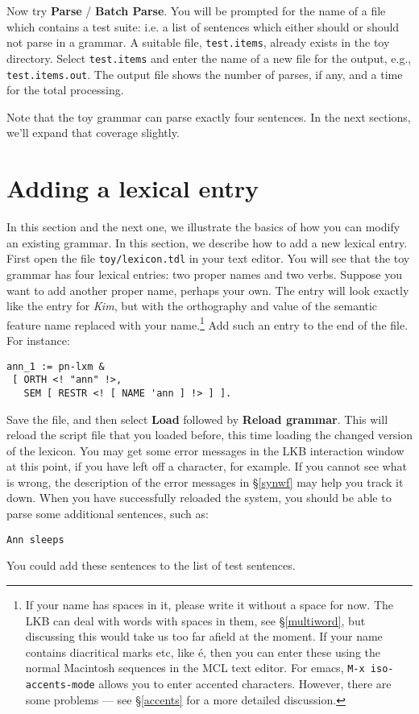 \documentclass[12pt]{report}
\begin{document}
Now try {\bf Parse} / {\bf Batch Parse}.  You will be prompted for the
name of a file which contains a test suite: i.e. a list of sentences
which either should or should not parse in a grammar.  A suitable file,
{\tt test.items}, already exists in the toy directory.  Select 
{\tt test.items} and enter the name of a new file for the output,
e.g., {\tt test.items.out}.  The output file shows the number of parses, if
any, and a time for the total processing.

Note that the toy grammar can parse exactly four 
sentences.  In the next sections, we'll expand that coverage slightly.


\section{Adding a lexical entry}

In this section and the next one, we illustrate the basics of how you can
modify an existing grammar.
In this section, we describe how to add a new lexical entry.
First open the file {\tt toy/lexicon.tdl} in your text editor.
You will see that
the toy grammar has four lexical entries: two proper names and two verbs.
Suppose you want to add another proper name,
perhaps your own.  The entry will look exactly like
the entry for {\it Kim}, but with the orthography and value
of the semantic feature {\sc name} replaced with your name.\footnote{If your name
has spaces in it, please write it without a space for now.  
The LKB can deal with words with spaces in them, see \S\ref{multiword},
but discussing this would take us too far afield at the moment.  If your name contains
diacritical marks etc, like \'{e}, then you can enter these 
using the normal Macintosh sequences 
in the MCL text editor.  For emacs, {\tt M-x iso-accents-mode} allows
you to enter accented characters.  
However, there are some problems --- see \S\ref{accents} for a more
detailed discussion.}
Add such an entry to the end of the file.
For instance:
\begin{verbatim}
ann_1 := pn-lxm & 
 [ ORTH <! "ann" !>,
   SEM [ RESTR <! [ NAME 'ann ] !> ] ].
\end{verbatim}
Save the file, and then select {\bf Load}
followed by {\bf Reload grammar}.  This will reload the script file that
you loaded before, this time loading the changed version of the lexicon.
You may get some error messages in the LKB interaction window
at this point, if you have left
off a character, for example.  If you cannot see what is wrong, the
description of the error messages in \S\ref{synwf} may help you
track it down.  When you have successfully reloaded the system,
you should be able to parse some additional sentences, such as:
\begin{verbatim}
Ann sleeps
\end{verbatim}
You could add these sentences to the list of test sentences.
\end{document}
